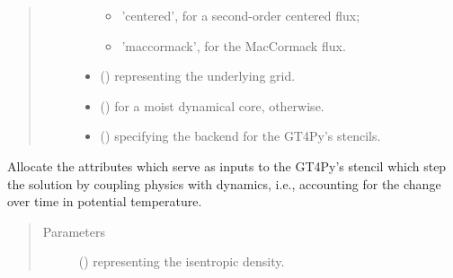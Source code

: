\documentclass[letterpaper,10pt,english]{sphinxmanual}
\begin{document}
\begin{fulllineitems}
\begin{fulllineitems}
\begin{quote}
\begin{description}
\begin{itemize}
\begin{itemize}
\item {} 
’centered’, for a second-order centered flux;

\item {} 
’maccormack’, for the MacCormack flux.

\end{itemize}


\item {} 
 () \textendash{} {\hyperref[\detokenize{api:grids.grid_xyz.GridXYZ}]{}} representing the underlying grid.

\item {} 
 () \textendash{}  for a moist dynamical core,  otherwise.

\item {} 
 () \textendash{}  specifying the backend for the GT4Py’s stencils.

\end{itemize}

\end{description}\end{quote}

\end{fulllineitems}


\begin{fulllineitems}
\label{\detokenize{api:dycore.prognostic_isentropic.PrognosticIsentropic._stencil_stepping_by_coupling_physics_with_dynamics_allocate_inputs}}
Allocate the attributes which serve as inputs to the GT4Py’s stencil which step the solution
by coupling physics with dynamics, i.e., accounting for the change over time in potential temperature.
\begin{quote}\begin{description}
\item[{Parameters}] \leavevmode
{} () \textendash{}  representing the isentropic density.


\end{description}
\end{quote}
\end{fulllineitems}
\end{fulllineitems}
\end{document}
